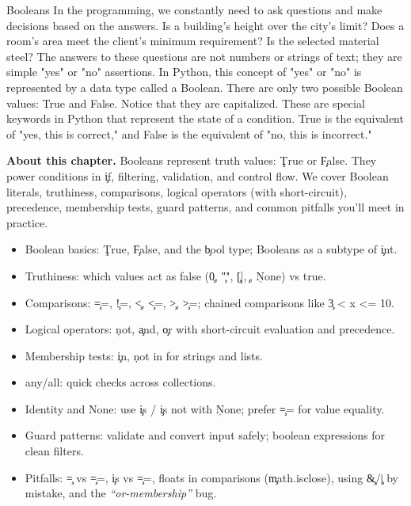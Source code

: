 
\h{Booleans}
In the programming, we constantly need to ask questions and make decisions based on the answers. Is a building's height over the city's limit? Does a room's area meet the client's minimum requirement? Is the selected material steel? The answers to these questions are not numbers or strings of text; they are simple "yes" or "no" assertions. In Python, this concept of "yes" or "no" is represented by a data type called a Boolean. There are only two possible Boolean values: True and False. Notice that they are capitalized. These are special keywords in Python that represent the state of a condition. True is the equivalent of "yes, this is correct," and False is the equivalent of "no, this is incorrect."
\medskip
\begin{NoteBox}
\textbf{About this chapter.}
Booleans represent truth values: \c{True} or \c{False}. They power conditions in \c{if},
filtering, validation, and control flow. We cover Boolean literals, truthiness, comparisons,
logical operators (with short-circuit), precedence, membership tests, guard patterns,
and common pitfalls you’ll meet in practice.
\end{NoteBox}
\medskip

\begin{tcolorbox}[%
    title=Focus of this chapter:,
    colframe=orange,
    colback = white,
    arc=2mm %
 ]
\begin{itemize}
  \item Boolean basics: \c{True}, \c{False}, and the \c{bool} type; Booleans as a subtype of \c{int}.
  \item Truthiness: which values act as false (\c{0}, \c{""}, \c{[]}, \c{{}}, \c{None}) vs true.
  \item Comparisons: \c{==}, \c{!=}, \c{<}, \c{<=}, \c{>}, \c{>=}; chained comparisons like \c{3 < x <= 10}.
  \item Logical operators: \c{not}, \c{and}, \c{or} with short-circuit evaluation and precedence.
  \item Membership tests: \c{in}, \c{not in} for strings and lists.
  \item any/all: quick checks across collections.
  \item Identity and None: use \c{is} / \c{is not} with \c{None}; prefer \c{==} for value equality.
  \item Guard patterns: validate and convert input safely; boolean expressions for clean filters.
  \item Pitfalls: \c{=} vs \c{==}, \c{is} vs \c{==}, floats in comparisons (\c{math.isclose}), using \c{&}/\c{|} by mistake, and the \emph{``or-membership''} bug.
\end{itemize}
\end{tcolorbox}

